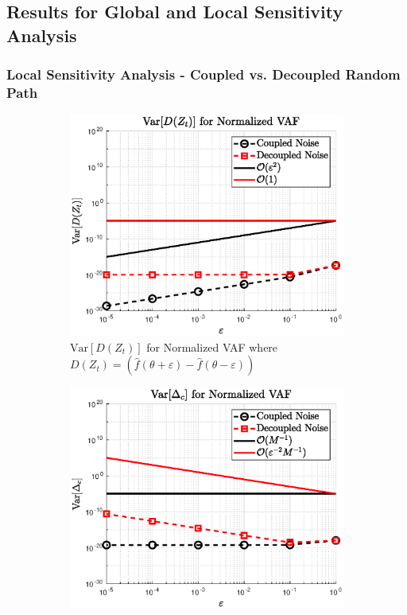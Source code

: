 \documentclass[a4paper,10pt]{beamer}
\newcommand{\sqb}[1]{\left[ #1 \right]}
\newcommand{\rb}[1]{\left( #1 \right)}
\begin{document}
	\begin{frame}
		\subsection{Results for Global and Local Sensitivity Analysis}
		\frametitle{Local Sensitivity Analysis - Coupled vs. Decoupled Random Path}
		\begin{figure}[H]
			\begin{subfigure}[b]{0.48\linewidth}
				\includegraphics[width=\linewidth]{./Plots/sensitivityAnalysis/VarianceC1.eps}
				\caption{\scriptsize $\text{Var}\sqb{D\rb{Z_{t}}}$ for Normalized VAF where $D\rb{Z_{t}} = \rb{\hat{f}\rb{\theta + \varepsilon} - \hat{f}\rb{\theta - \varepsilon}}$}
			\end{subfigure}
			\begin{subfigure}[b]{0.48\linewidth}
				\includegraphics[width=\linewidth]{./Plots/sensitivityAnalysis/VarianceC1_CD.eps}

\end{subfigure}
\end{figure}
\end{frame}
\end{document}
